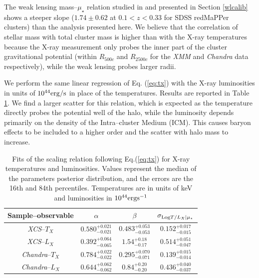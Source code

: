 The weak lensing mass--$\mu_\star$ relation studied in \citet{maria} and presented in Section \ref{wlcalib} shows a steeper slope ($1.74\pm 0.62$ at $0.1<z<0.33$ for SDSS redMaPPer clusters) than the analysis presented here. We believe that the correlation of stellar mass with total cluster mass is higher than with the X-ray temperatures because the X-ray measurement only probes the inner part of the cluster gravitational potential (within $R_{500c}$ and $R_{2500c}$ for the \emph{XMM} and \emph{Chandra} data respectively), while the weak lensing probes larger radii.

We perform the same linear regression of Eq. (\ref{eq:tx}) with the X-ray luminosities in units of $10^{44} {\rm erg/s}$ in place of the temperatures. Results are reported in Table \ref{tab:tx}. We find a larger scatter for this relation, which is expected as the temperature directly probes the potential well of the halo, while the luminosity depends primarily on the density of the Intra--cluster Medium (ICM). This causes baryon effects to be included to a higher order and the scatter with halo mass to increase.

\begin{table}\centering
\begin{tabular}{c|ccc}
\hline
\hline
 Sample--observable &$\alpha$&$\beta$&$\sigma_{{\rm Log} T/L_X|\mu_\star}$\\
 \hline
\emph{XCS}--$T_X$ & $0.580^{+0.021}_{-0.021}$ & $0.483^{+0.053}_{-0.053}$ & $0.152^{+0.017}_{-0.015}$\\
\emph{XCS}--$L_X$ & $0.392^{+0.064}_{-0.065}$ & $1.54^{+0.18}_{-0.17}$ & $0.514^{+0.051}_{-0.047}$\\
\emph{Chandra}--$T_X$ & $0.784^{+0.022}_{-0.022}$ & $0.295^{+0.070}_{-0.071}$ & $0.139^{+0.015}_{-0.014}$\\
\emph{Chandra}--$L_X$ & $0.644^{+0.062}_{-0.062}$ & $0.84^{+0.20}_{-0.20}$ & $0.436^{+0.040}_{-0.037}$\\
\end{tabular}\caption{Fits of the scaling relation following Eq.(\ref{eq:tx}) for X-ray temperatures and luminosities. Values represent the median of the parameters posterior distribution, and the errors are the 16th and 84th percentiles. Temperatures are in units of keV and luminosities in $10^{44} {\rm erg s^{-1}}$}\label{tab:tx}
\end{table}

